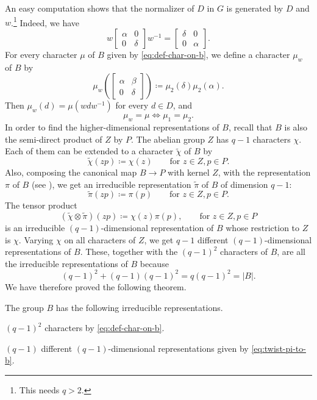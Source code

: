 \documentclass[../main.tex]{subfiles}
\begin{document}
An easy computation shows that the normalizer of $D$ in $G$ is generated by $D$ and $w$.\footnote{This needs $q>2$.} Indeed, we have
\[w\begin{bmatrix}
	\alpha & 0 \\
	0 & \delta
\end{bmatrix}w^{-1}=\begin{bmatrix}
	\delta & 0 \\
	0 & \alpha
\end{bmatrix}.\]
For every character $\mu$ of $B$ given by \eqref{eq:def-char-on-b}, we define a character $\mu_w$ of $B$ by
\[\mu_w\left(\begin{bmatrix}
	\alpha & \beta \\
	0 & \delta
\end{bmatrix}\right)\coloneqq\mu_2(\delta)\mu_2(\alpha).\]
Then $\mu_w(d)=\mu\left(wdw^{-1}\right)$ for every $d\in D$, and
\[\mu_w=\mu\iff\mu_1=\mu_2.\]
In order to find the higher-dimensional representations of $B$, recall that $B$ is also the semi-direct product of $Z$ by $P$. The abelian group $Z$ has $q-1$ characters $\chi$. Each of them can be extended to a character $\widetilde\chi$ of $B$ by
\[\widetilde\chi(zp)\coloneqq\chi(z)\qquad\text{for }z\in Z,p\in P.\]
Also, composing the canonical map $B\to P$ with kernel $Z$, with the representation $\pi$ of $B$ (see ), we get an irreducible representation $\widetilde\pi$ of $B$ of dimension $q-1$:
\[\widetilde\pi(zp)\coloneqq\pi(p)\qquad\text{for }z\in Z,p\in P.\]
The tensor product
\begin{equation}
	(\widetilde\chi\otimes\widetilde\pi)(zp)\coloneqq\chi(z)\pi(p),\qquad\text{for }z\in Z,p\in P \label{eq:twist-pi-to-b}
\end{equation}
is an irreducible $(q-1)$-dimensional representation of $B$ whose restriction to $Z$ is $\chi$. Varying $\chi$ on all characters of $Z$, we get $q-1$ different $(q-1)$-dimensional representations of $B$. These, together with the $(q-1)^2$ characters of $B$, are all the irreducible representations of $B$ because
\[(q-1)^2+(q-1)(q-1)^2=q(q-1)^2=\left|B\right|.\]
We have therefore proved the following theorem.
\begin{theorem}
	The group $B$ has the following irreducible representations.
	\begin{listalph}
		\item $(q-1)^2$ characters by \eqref{eq:def-char-on-b}.
		\item $(q-1)$ different $(q-1)$-dimensional representations given by \eqref{eq:twist-pi-to-b}.
	\end{listalph}
\end{theorem}
\end{document}

